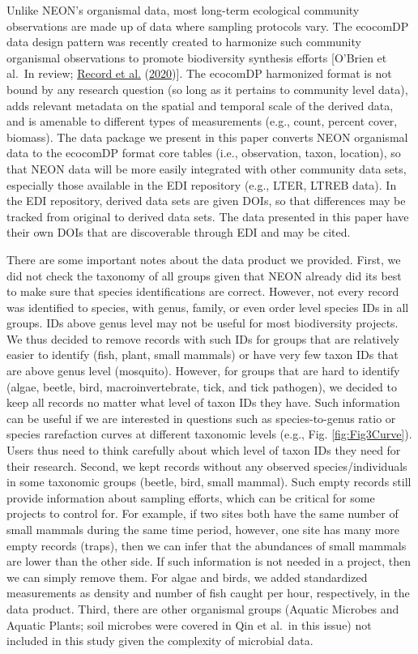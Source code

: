 \documentclass[
  12pt,
]{article}
\begin{document}
Unlike NEON's organismal data, most long-term ecological community observations are made up of data where sampling protocols vary. The ecocomDP data design pattern was recently created to harmonize such community organismal observations to promote biodiversity synthesis efforts {[}O'Brien et al.~In review; \protect\hyperlink{ref-record2020novel}{Record et al.} (\protect\hyperlink{ref-record2020novel}{2020}){]}. The ecocomDP harmonized format is not bound by any research question (so long as it pertains to community level data), adds relevant metadata on the spatial and temporal scale of the derived data, and is amenable to different types of measurements (e.g., count, percent cover, biomass). The data package we present in this paper converts NEON organismal data to the ecocomDP format core tables (i.e., observation, taxon, location), so that NEON data will be more easily integrated with other community data sets, especially those available in the EDI repository (e.g., LTER, LTREB data). In the EDI repository, derived data sets are given DOIs, so that differences may be tracked from original to derived data sets. The data presented in this paper have their own DOIs that are discoverable through EDI and may be cited.

There are some important notes about the data product we provided. First, we did not check the taxonomy of all groups given that NEON already did its best to make sure that species identifications are correct. However, not every record was identified to species, with genus, family, or even order level species IDs in all groups. IDs above genus level may not be useful for most biodiversity projects. We thus decided to remove records with such IDs for groups that are relatively easier to identify (fish, plant, small mammals) or have very few taxon IDs that are above genus level (mosquito). However, for groups that are hard to identify (algae, beetle, bird, macroinvertebrate, tick, and tick pathogen), we decided to keep all records no matter what level of taxon IDs they have. Such information can be useful if we are interested in questions such as species-to-genus ratio or species rarefaction curves at different taxonomic levels (e.g., Fig. \ref{fig:Fig3Curve}). Users thus need to think carefully about which level of taxon IDs they need for their research. Second, we kept records without any observed species/individuals in some taxonomic groups (beetle, bird, small mammal). Such empty records still provide information about sampling efforts, which can be critical for some projects to control for. For example, if two sites both have the same number of small mammals during the same time period, however, one site has many more empty records (traps), then we can infer that the abundances of small mammals are lower than the other side. If such information is not needed in a project, then we can simply remove them. For algae and birds, we added standardized measurements as density and number of fish caught per hour, respectively, in the data product. Third, there are other organismal groups (Aquatic Microbes and Aquatic Plants; soil microbes were covered in Qin et al.~in this issue) not included in this study given the complexity of microbial data.
\end{document}
